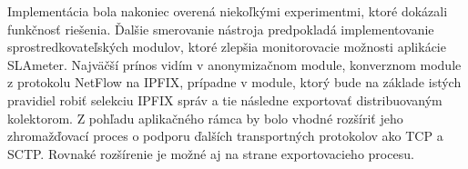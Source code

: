 Implementácia bola nakoniec overená niekoľkými experimentmi, ktoré dokázali funkčnosť riešenia. Ďalšie 
smerovanie nástroja predpokladá implementovanie sprostredkovateľských modulov, ktoré zlepšia monitorovacie 
možnosti aplikácie SLAmeter. Najväčší prínos vidím v anonymizačnom module, konverznom module z protokolu 
NetFlow na IPFIX, prípadne v module, ktorý
bude na základe istých pravidiel robiť selekciu IPFIX správ a tie následne exportovať distribuovaným 
kolektorom. Z pohľadu aplikačného rámca by bolo vhodné rozšíriť jeho zhromažďovací proces o podporu 
ďalších transportných protokolov ako TCP a SCTP. Rovnaké rozšírenie je možné aj na strane exportovacieho 
procesu.



